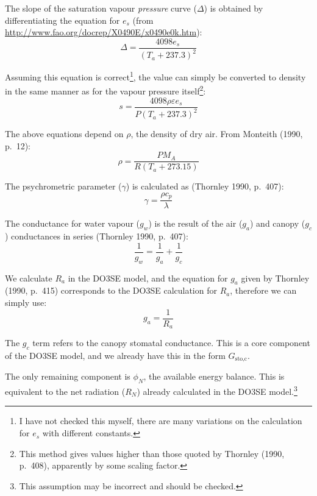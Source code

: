 \documentclass[a4paper]{article}
\begin{document}
The slope of the saturation vapour \emph{pressure} curve ($\Delta$) is obtained by differentiating 
the equation for $e_s$ (from \url{http://www.fao.org/docrep/X0490E/x0490e0k.htm}):
\begin{equation}
\label{e:deltavp}
\Delta = \frac{4098 e_s}{(T_a + 237.3)^2}
\end{equation}

Assuming this equation is correct\footnote{I have not checked this myself, there are many variations 
on the calculation for $e_s$ with different constants.}, the value can simply be converted to 
density in the same manner as for the vapour pressure itself\footnote{This method gives values 
    higher than those quoted by Thornley (1990, p.~408), apparently by some scaling factor.}:
\begin{equation}
s = \frac{4098 \rho \varepsilon e_s}{P(T_a + 237.3)^2}
\end{equation}

The above equations depend on $\rho$, the density of dry air.  From Monteith (1990, p.~12):
\begin{equation}
\rho = \frac{P M_A}{R (T_a + 273.15)}
\end{equation}

The psychrometric parameter ($\gamma$) is calculated as (Thornley 1990, p.~407):
\begin{equation}
\gamma = \frac{\rho c_p}{\lambda}
\end{equation}

The conductance for water vapour ($g_w$) is the result of the air ($g_a$) and canopy ($g_c$) 
    conductances in series (Thornley 1990, p.~407):
\begin{equation}
\frac{1}{g_w} = \frac{1}{g_a} + \frac{1}{g_c}
\end{equation}

We calculate $R_a$ in the DO3SE model, and the equation for $g_a$ given by Thornley (1990, p.~415) 
        corresponds to the DO3SE calculation for $R_a$, therefore we can simply use:
\begin{equation}
g_a = \frac{1}{R_a}
\end{equation}

The $g_c$ term refers to the canopy stomatal conductance.  This is a core component of the DO3SE 
model, and we already have this in the form $G_{\text{sto,c}}$.

The only remaining component is $\phi_N$, the available energy balance.  This is equivalent to the 
net radiation ($R_N$) already calculated in the DO3SE model.\footnote{This assumption may be 
    incorrect and should be checked.}
\end{document}
